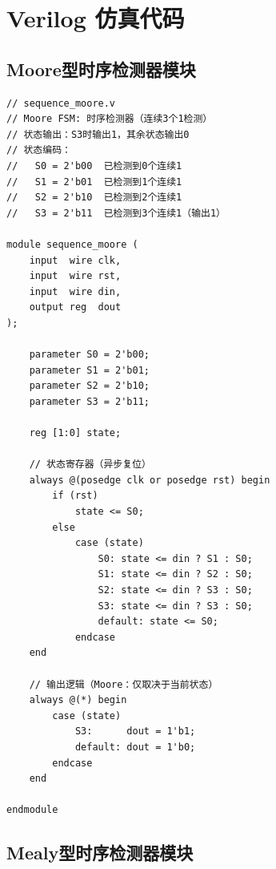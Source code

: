 \documentclass[12pt,a4paper]{article}
\begin{document}
\section{Verilog 仿真代码}

\subsection{Moore型时序检测器模块}

\begin{lstlisting}[caption={sequence\_moore.v --- Moore型时序检测器}, label=lst:moore]
// sequence_moore.v
// Moore FSM: 时序检测器（连续3个1检测）
// 状态输出：S3时输出1，其余状态输出0
// 状态编码：
//   S0 = 2'b00  已检测到0个连续1
//   S1 = 2'b01  已检测到1个连续1
//   S2 = 2'b10  已检测到2个连续1
//   S3 = 2'b11  已检测到3个连续1（输出1）

module sequence_moore (
    input  wire clk,
    input  wire rst,
    input  wire din,
    output reg  dout
);

    parameter S0 = 2'b00;
    parameter S1 = 2'b01;
    parameter S2 = 2'b10;
    parameter S3 = 2'b11;

    reg [1:0] state;

    // 状态寄存器（异步复位）
    always @(posedge clk or posedge rst) begin
        if (rst)
            state <= S0;
        else
            case (state)
                S0: state <= din ? S1 : S0;
                S1: state <= din ? S2 : S0;
                S2: state <= din ? S3 : S0;
                S3: state <= din ? S3 : S0;
                default: state <= S0;
            endcase
    end

    // 输出逻辑（Moore：仅取决于当前状态）
    always @(*) begin
        case (state)
            S3:      dout = 1'b1;
            default: dout = 1'b0;
        endcase
    end

endmodule
\end{lstlisting}

\subsection{Mealy型时序检测器模块}
\end{document}
